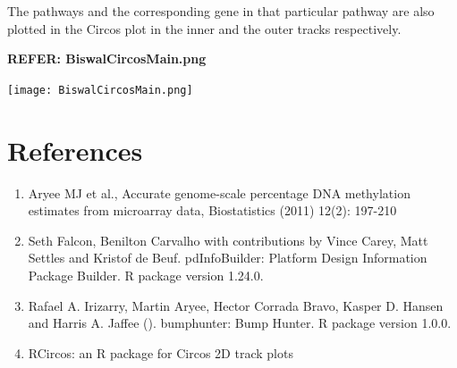 \documentclass[11pt]{article}
\begin{document}
The pathways and the corresponding gene in that particular pathway are also plotted in the Circos plot in the inner and the outer tracks respectively.

{\bf REFER: BiswalCircosMain.png}


\texttt{[image: BiswalCircosMain.png]}



% 
 
% 
%
% 


\section*{References}  
\begin{enumerate}


	\item  Aryee MJ et al., Accurate genome-scale percentage DNA methylation estimates
	  from microarray data, Biostatistics (2011) 12(2): 197-210 	

	\item  Seth Falcon, Benilton Carvalho with contributions by Vince Carey, Matt
	  Settles and Kristof de Beuf. pdInfoBuilder: Platform Design Information
	  Package Builder. R package version 1.24.0.
	
	\item   Rafael A. Irizarry, Martin Aryee, Hector Corrada Bravo, Kasper D. Hansen and	Harris A. Jaffee (). bumphunter: Bump Hunter. R package version 1.0.0.
		
	\item RCircos: an R package for Circos 2D track plots
	
	
 \end{enumerate}

 
 
 
 
 
\end{document}
